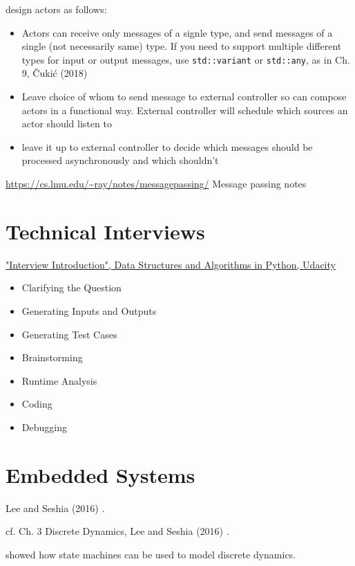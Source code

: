 \documentclass[10pt]{amsart}
\begin{document}
design actors as follows:

\begin{itemize}
	\item Actors can receive only messages of a signle type, and send messages of a single (not necessarily same) type. If you need to support multiple different types for input or output messages, use \verb|std::variant| or \verb|std::any|, as in Ch. 9, \v{C}uki\'{c} (2018) \cite{Cuki2008}
	\item Leave choice of whom to send message to external controller so can compose actors in a functional way. External controller will schedule which sources an actor should listen to
	\item leave it up to external controller to decide which messages should be processed asynchronously and which shouldn't
\end{itemize}

\url{https://cs.lmu.edu/~ray/notes/messagepassing/} Message passing notes
	
\part{Technical Interviews}

\href{https://classroom.udacity.com/courses/ud513/lessons/7707710408/concepts/77114606610923}{"Interview Introduction", Data Structures and Algorithms in Python, Udacity}

\begin{itemize}
	\item Clarifying the Question
	\item Generating Inputs and Outputs
	\item Generating Test Cases
	\item Brainstorming
	\item Runtime Analysis
	\item Coding
	\item Debugging
\end{itemize}

\part{Embedded Systems}

Lee and Seshia (2016) \cite{LeSe2016}.

cf. Ch. 3 Discrete Dynamics, Lee and Seshia (2016) \cite{LeSe2016}. 

showed how state machines can be used to model discrete dynamics.
\end{document}

